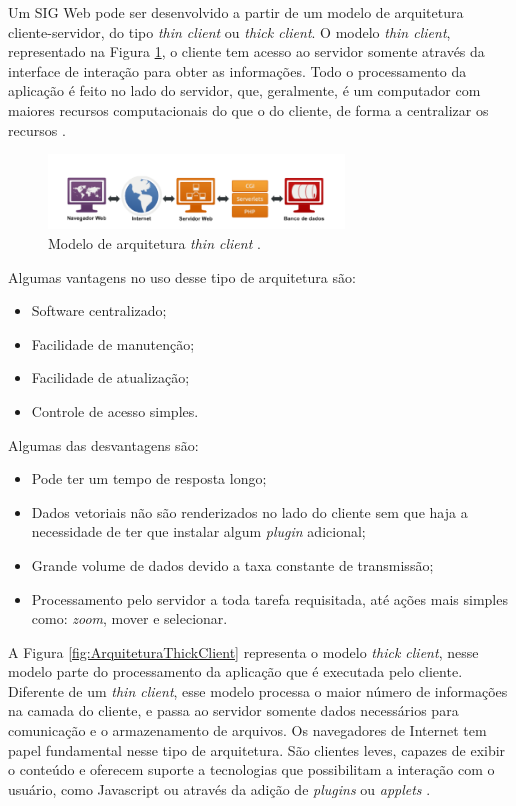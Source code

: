 Um SIG Web pode ser desenvolvido a partir de um modelo de arquitetura cliente-servidor, do tipo \textit{thin client} ou \textit{thick client}. O modelo  \textit{thin client}, representado na Figura \ref{fig:ArquiteturaThinClient}, o cliente tem acesso ao servidor somente através da interface de interação para obter as informações. Todo o processamento da aplicação é feito no lado do servidor, que, geralmente, é um computador com maiores recursos computacionais do que o do cliente, de forma a centralizar os recursos \cite{websisbra}.

\begin{figure}[h]
\centering
\includegraphics[width=0.70\textwidth]{./img/cap_III/5-ArquiteturaThinClient}
\caption{Modelo de arquitetura \textit{thin client} \cite{websisbra}.}
\label{fig:ArquiteturaThinClient}
\end{figure}

Algumas vantagens no uso desse tipo de arquitetura são:

\begin{itemize}
\item Software centralizado;
\item Facilidade de manutenção;
\item Facilidade de atualização;
\item Controle de acesso simples.
\end{itemize}

Algumas das desvantagens são:

\begin{itemize}
\item Pode ter um tempo de resposta longo;
\item Dados vetoriais não são renderizados no lado do cliente sem que haja a necessidade de ter que instalar algum \textit{plugin} adicional;
\item Grande volume de dados devido a taxa constante de transmissão;
\item Processamento pelo servidor a toda tarefa requisitada, até ações mais simples como: \textit{zoom}, mover e selecionar.
\end{itemize}

A Figura \ref{fig:ArquiteturaThickClient} representa o modelo \textit{thick client}, nesse modelo parte do processamento da aplicação que é executada pelo cliente. Diferente de um \textit{thin client}, esse modelo processa o maior número de informações na camada do cliente, e passa ao servidor somente dados necessários para comunicação e o armazenamento de arquivos. Os navegadores de Internet tem papel fundamental nesse tipo de arquitetura. São clientes leves, capazes de exibir o conteúdo e oferecem suporte a tecnologias que possibilitam a interação com o usuário, como Javascript ou através da adição de \textit{plugins} ou \textit{applets} \cite{websisbra}.

